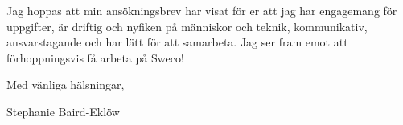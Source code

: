 \documentclass[11pt,a4paper,sans]{moderncv}        %
\begin{document}

Jag hoppas att %
min ans{\"o}kningsbrev har visat f{\"o}r er att jag har engagemang för uppgifter,
är driftig och nyfiken på människor och teknik, kommunikativ, ansvarstagande och har lätt för att samarbeta.
Jag ser fram emot att f{\"o}rhoppningsvis f{\aa} arbeta p{\aa} Sweco!

Med v{\"a}nliga h{\"a}lsningar,


Stephanie Baird-Ekl{\"o}w


\end{document}
